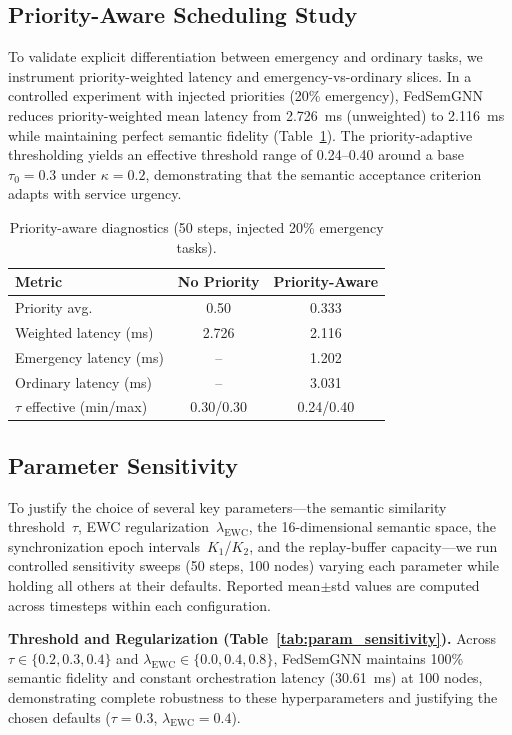 \documentclass[conference]{IEEEtran}
\begin{document}
	\subsection{Priority-Aware Scheduling Study}
	To validate explicit differentiation between emergency and ordinary tasks, we instrument priority-weighted latency and emergency-vs-ordinary slices. In a controlled experiment with injected priorities (20\% emergency), FedSemGNN reduces priority-weighted mean latency from 2.726~ms (unweighted) to 2.116~ms while maintaining perfect semantic fidelity (Table~\ref{tab:priority_study}). The priority-adaptive thresholding yields an effective threshold range of 0.24--0.40 around a base $\tau_0{=}0.3$ under $\kappa{=}0.2$, demonstrating that the semantic acceptance criterion adapts with service urgency.

	\begin{table}[t]
	\centering
	\caption{Priority-aware diagnostics (50 steps, injected 20\% emergency tasks).}
	\label{tab:priority_study}
	\small
	\begin{tabular}{lcc}
	\toprule
	\textbf{Metric} & \textbf{No Priority} & \textbf{Priority-Aware} \\
	\midrule
	Priority avg. & 0.50 & 0.333 \\
	Weighted latency (ms) & 2.726 & 2.116 \\
	Emergency latency (ms) & -- & 1.202 \\
	Ordinary latency (ms) & -- & 3.031 \\
	$\tau$ effective (min/max) & 0.30/0.30 & 0.24/0.40 \\
	\bottomrule
	\end{tabular}
	\end{table}
	
	\subsection{Parameter Sensitivity}
	To justify the choice of several key parameters---the semantic similarity threshold~$\tau$, EWC regularization~$\lambda_{\mathrm{EWC}}$, the 16-dimensional semantic space, the synchronization epoch intervals~$K_1$/$K_2$, and the replay-buffer capacity---we run controlled sensitivity sweeps (50 steps, 100 nodes) varying each parameter while holding all others at their defaults. Reported mean$\pm$std values are computed across timesteps within each configuration.

	\textbf{Threshold and Regularization (Table~\ref{tab:param_sensitivity}).}
	Across $\tau \in \{0.2, 0.3, 0.4\}$ and $\lambda_{\mathrm{EWC}} \in \{0.0, 0.4, 0.8\}$, FedSemGNN maintains 100\% semantic fidelity and constant orchestration latency (30.61~ms) at 100 nodes, demonstrating complete robustness to these hyperparameters and justifying the chosen defaults ($\tau{=}0.3$, $\lambda_{\mathrm{EWC}}{=}0.4$).
\end{document}
